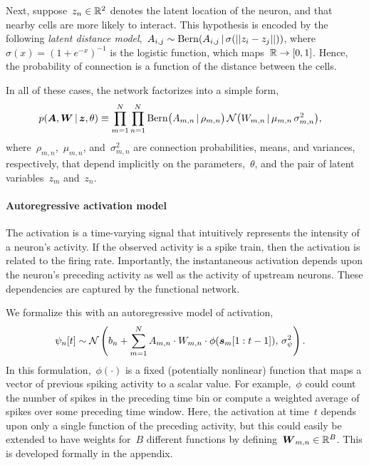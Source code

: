 Next, suppose~$z_n \in \mathbb{R}^2$ denotes the latent location of the neuron, and that nearby cells are more likely to interact. 
This hypothesis is encoded by the following \emph{latent distance model},~${A_{i,j} \sim \mathrm{Bern}(A_{i,j} \,|\, \sigma(||z_i - z_j||))}$, where~$\sigma(x)=(1+e^{-x})^{-1}$ is the logistic function, which maps~$\mathbb{R} \to [0,1]$.
Hence, the probability of connection is a function of the distance between the cells.


In all of these cases, the network factorizes into a simple form,
\begin{align}
p(\boldsymbol{A}, \boldsymbol{W} \,|\, \boldsymbol{z}, \theta) &\equiv 
\prod_{m=1}^N \prod_{n=1}^N \mathrm{Bern} \big(A_{m,n} \,|\, \rho_{m,n} \big) \,
\mathcal{N} \big(W_{m,n} \,|\, \mu_{m,n}\, \sigma_{m,n}^2 \big),
\end{align}
where~$\rho_{m,n}$,~$\mu_{m,n}$, and~$\sigma_{m,n}^2$ are connection probabilities, means, and variances, respectively, that depend implicitly on the parameters,~$\theta$, and the pair of latent variables~$z_m$ and~$z_n$.

\paragraph{Autoregressive activation model}
The activation is a time-varying signal that intuitively represents the intensity of a neuron's activity. 
If the observed activity is a spike train, then the activation is related to the firing rate.
Importantly, the instantaneous activation depends upon the neuron's preceding activity as well as the activity of upstream neurons. 
These dependencies are captured by the functional network.

We formalize this with an autoregressive model of activation,
\begin{align}
\psi_{n}[t] &\sim \mathcal{N}\left( b_n + \sum_{m=1}^N A_{m,n} \cdot W_{m,n} \cdot \phi(\boldsymbol{s}_m[1:t-1]), \, \sigma_\psi^2 \right).
\end{align}
In this formulation,~$\phi(\cdot)$ is a fixed (potentially nonlinear) function that maps a vector of previous spiking activity to a scalar value. For example,~$\phi$ could count the number of spikes in the preceding time bin or compute a weighted average of spikes over some preceding time window. Here, the activation at time~$t$ depends upon only a single function of the preceding activity, but this could easily be extended to have weights for~$B$ different functions by defining~$\boldsymbol{W}_{m,n} \in \mathbb{R}^B$.
This is developed formally in the appendix.

